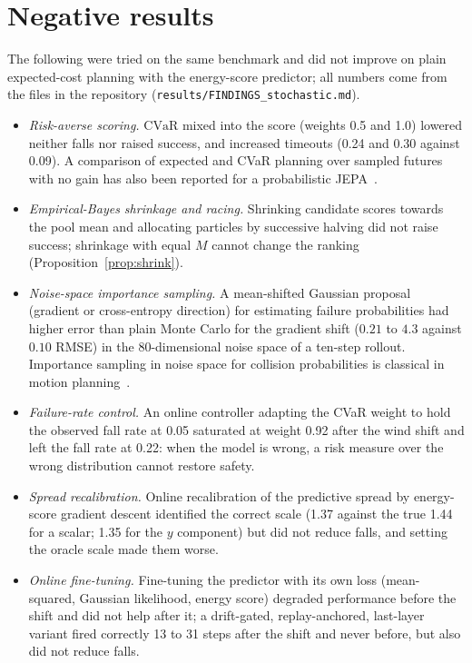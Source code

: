 \documentclass[preprint,12pt]{elsarticle}
\begin{document}
\section{Negative results}\label{sec:negative}

The following were tried on the same benchmark and did not improve on plain expected-cost planning with the energy-score predictor; all numbers come from the files in the repository (\texttt{results/FINDINGS\_stochastic.md}).
\begin{itemize}
\item \emph{Risk-averse scoring.} $\mathrm{CVaR}$ mixed into the score (weights 0.5 and 1.0) lowered neither falls nor raised success, and increased timeouts (0.24 and 0.30 against 0.09). A comparison of expected and CVaR planning over sampled futures with no gain has also been reported for a probabilistic JEPA~\cite{djepa2026}.
\item \emph{Empirical-Bayes shrinkage and racing.} Shrinking candidate scores towards the pool mean and allocating particles by successive halving did not raise success; shrinkage with equal $M$ cannot change the ranking (Proposition~\ref{prop:shrink}).
\item \emph{Noise-space importance sampling.} A mean-shifted Gaussian proposal (gradient or cross-entropy direction) for estimating failure probabilities had higher error than plain Monte Carlo for the gradient shift ($0.21$ to $4.3$ against $0.10$ RMSE) in the 80-dimensional noise space of a ten-step rollout. Importance sampling in noise space for collision probabilities is classical in motion planning~\cite{janson2015mcmp,schmerling2017adaptive}.
\item \emph{Failure-rate control.} An online controller adapting the CVaR weight to hold the observed fall rate at 0.05 saturated at weight 0.92 after the wind shift and left the fall rate at 0.22: when the model is wrong, a risk measure over the wrong distribution cannot restore safety.
\item \emph{Spread recalibration.} Online recalibration of the predictive spread by energy-score gradient descent identified the correct scale (1.37 against the true 1.44 for a scalar; 1.35 for the $y$ component) but did not reduce falls, and setting the oracle scale made them worse.
\item \emph{Online fine-tuning.} Fine-tuning the predictor with its own loss (mean-squared, Gaussian likelihood, energy score) degraded performance before the shift and did not help after it; a drift-gated, replay-anchored, last-layer variant fired correctly 13 to 31 steps after the shift and never before, but also did not reduce falls.

\end{itemize}
\end{document}
